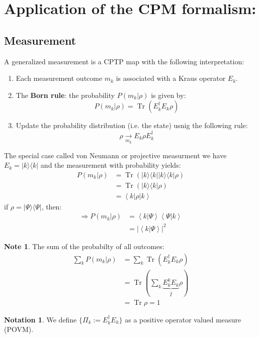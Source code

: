 \documentclass[12pt]{book}
\theoremstyle{definition}
\newtheorem*{note}{\bfseries Note}
\newtheorem*{notation}{\bfseries Notation}
\newcommand{\scalar}[1]{\left\langle {#1}\right\rangle}
\newcommand{\abs}[1]{\left\vert {#1}\right\vert}
\let\oldsum\sum
\renewcommand{\sum}[2]{\oldsum\limits_{#1}^{#2}}
\renewcommand{\to}{\longrightarrow}
\newcommand{\para}[1]{\left( {#1} \right)}
\newcommand{\bra}[1]{\langle {#1} \vert}
\newcommand{\ket}[1]{\vert {#1} \rangle}
\DeclareMathOperator{\tr}{Tr}
\begin{document}
\section{Application of the CPM formalism:}
\subsection{Measurement}
A generalized measurement is a CPTP map with the following interpretation:
\begin{enumerate}[label = (\roman*)]
  \item Each measurement outcome $m_k$ is associated with a Kraus operator $E_k$.
  \item The \textbf{Born rule}: the probability $P(m_k \vert \rho)$ is given by:
  \begin{equation}
    P(m_k \vert \rho) = \tr(E_k^\dagger E_k \rho)
  \end{equation}
  \item Update the probability distribution (i.e. the state) usnig the following rule:
  \begin{equation}
    \rho \underset{m_k}{\to} E_k \rho E_k^\dagger
  \end{equation}
\end{enumerate}
The special case called von Neumann or projective measurment we have $E_k = \ket{k}\bra{k}$ and the measurement with probability yields:
\begin{align*}
  P(m_k \vert \rho) & = \tr(\ket{k}\bra{k} \ket{k}\bra{k} \rho) \\
  & = \tr(\ket{k} \bra{k} \rho) \\
  & = \scalar{k \vert \rho \vert k}
\end{align*}
if $\rho = \ket{\Psi} \bra{\Psi}$, then:
\begin{align*}
  \Longrightarrow P(m_k \vert \rho) & = \scalar{k \vert \Psi} \scalar{\Psi \vert k} \\
  & = \abs{\scalar{k \vert \Psi}}^2
\end{align*}
\begin{note}
  The sum of the probabilty of all outcomes:
  \begin{align*}
    \oldsum_k P(m_k \vert \rho) & = \oldsum_k \tr(E_k^\dagger E_k \rho) \\
    & = \tr\para{\oldsum_k \underbrace{E_k^k E_k}_{\hat I} \rho} \\
    & = \tr \rho = 1
  \end{align*}
\end{note}
\begin{notation}
  We define $\{\Pi_k := E_k^\dagger E_k \}$ as a positive operator valued measure (POVM).
\end{notation}
\end{document}
